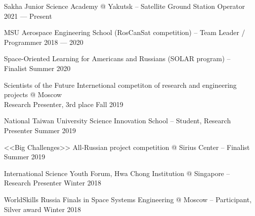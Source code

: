 Sakha Junior Science Academy @ Yakutsk -- Satellite Ground Station Operator \hfill 2021 --- Present

MSU Aerospace Engineering School (RosCanSat competition) -- Team Leader / Programmer	\hfill 2018 --- 2020
 
Space-Oriented Learning for Americans and Russians (SOLAR program) -- Finalist	\hfill Summer 2020

Scientists of the Future Internetional competiton of research and engineering projects @ Moscow \\ Research Presenter, 3rd place 	\hfill Fall 2019

National Taiwan University Science Innovation School -- Student, Research Presenter	\hfill Summer 2019

<<Big Challenges>> All-Russian project competition @ Sirius Center -- Finalist	\hfill Summer 2019

International Science Youth Forum, Hwa Chong Institution @ Singapore -- Research Presenter	\hfill Winter 2018

WorldSkills Russia Finals in Space Systems Engineering @ Moscow -- Participant, Silver award	\hfill Winter 2018

